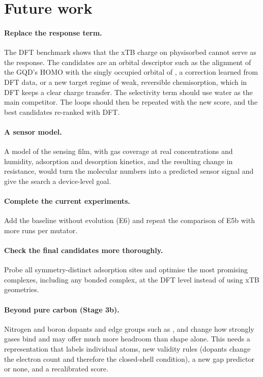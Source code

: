 \section{Future work}
\label{sec:future}

\paragraph{Replace the response term.} The DFT benchmark shows that the xTB charge on physisorbed
 cannot serve as the response. The candidates are an orbital descriptor such as the
alignment of the GQD's HOMO with the singly occupied orbital of , a correction learned from
DFT data, or a new target regime of weak, reversible chemisorption, which in DFT keeps a clear
charge transfer. The selectivity term should use water as the main competitor. The loops should
then be repeated with the new score, and the best candidates re-ranked with DFT.

\paragraph{A sensor model.} A model of the sensing film, with gas coverage at real concentrations
and humidity, adsorption and desorption kinetics, and the resulting change in resistance, would
turn the molecular numbers into a predicted sensor signal and give the search a device-level goal.

\paragraph{Complete the current experiments.} Add the baseline without evolution (E6) and repeat
the comparison of E5b with more runs per mutator.

\paragraph{Check the final candidates more thoroughly.} Probe all symmetry-distinct adsorption
sites and optimise the most promising complexes, including any bonded  complex, at the DFT
level instead of using xTB geometries.

\paragraph{Beyond pure carbon (Stage 3b).} Nitrogen and boron dopants and edge groups such as
,  and  change how strongly gases bind \cite{zhang2009dopants} and may
offer much more headroom than shape alone. This needs a representation that labels individual
atoms, new validity rules (dopants change the electron count and therefore the closed-shell
condition), a new gap predictor or none, and a recalibrated score.

